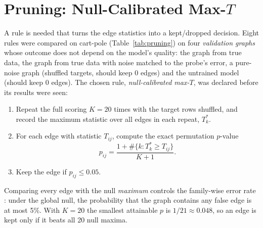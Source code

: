 \documentclass[11pt, a4paper, oneside,enumerate,textcomp]{report}
\begin{document}
\section{Pruning: Null-Calibrated Max-$T$}

A rule is needed that turns the edge statistics into a kept/dropped decision. Eight rules were compared on cart-pole (Table~\ref{tab:pruning}) on four \emph{validation graphs} whose outcome does not depend on the model's quality: the graph from true data, the graph from true data with noise matched to the probe's error, a pure-noise graph (shuffled targets, should keep 0 edges) and the untrained model (should keep 0 edges). The chosen rule, \emph{null-calibrated max-$T$}, was declared before its results were seen:
\begin{enumerate}
	\item Repeat the full scoring $K = 20$ times with the target rows shuffled, and record the maximum statistic over all edges in each repeat, $T^{*}_k$.
	\item For each edge with statistic $T_{ij}$, compute the exact permutation $p$-value
	\begin{equation}
	p_{ij} = \frac{1 + \#\{k : T^{*}_k \geq T_{ij}\}}{K + 1}.
	\label{eq:maxT}
	\end{equation}
	\item Keep the edge if $p_{ij} \leq 0.05$.
\end{enumerate}
Comparing every edge with the null \emph{maximum} controls the family-wise error rate \cite{westfall1993resampling}: under the global null, the probability that the graph contains any false edge is at most 5\%. With $K = 20$ the smallest attainable $p$ is $1/21 \approx 0.048$, so an edge is kept only if it beats all 20 null maxima.
\end{document}
